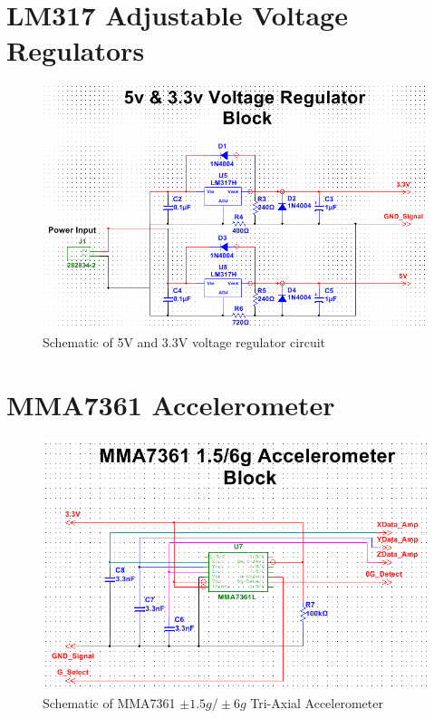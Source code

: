\section{LM317 Adjustable Voltage Regulators}
\begin{figure}[H]
\centering
\includegraphics[width=\textwidth,height=\textheight,keepaspectratio]{./KIRBY_Images/Multisim_VoltageRegulation}
\caption{Schematic of 5V and 3.3V voltage regulator circuit}
\label{fig:Schematic_VoltageReg}
\end{figure}

\section{MMA7361 Accelerometer}
\begin{figure}[H]
\centering
\includegraphics[width=\textwidth,height=\textheight,keepaspectratio]{./KIRBY_Images/Multisim_MMA7361}
\caption{Schematic of MMA7361 $\pm 1.5g/ \pm 6g$ Tri-Axial Accelerometer}
\label{fig:Schematic_MMA7361}
\end{figure}